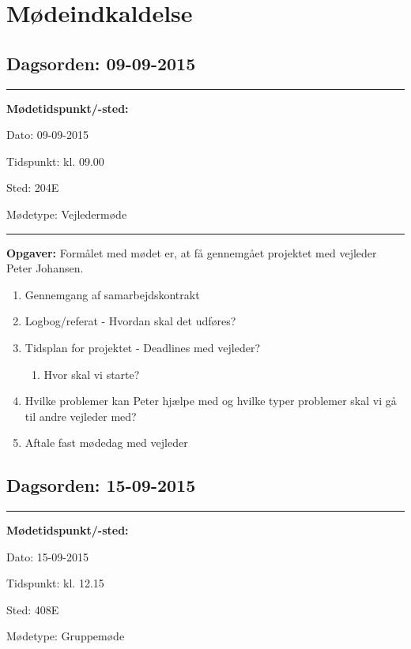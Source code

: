 \chapter{Mødeindkaldelse}


\section{Dagsorden: 09-09-2015}
\hrule



\textbf{Mødetidspunkt/-sted:} 

Dato: \tabto{7em} 09-09-2015

Tidspunkt: \tabto{7em} kl. 09.00

Sted: \tabto{7em} 204E

Mødetype: \tabto{7em} Vejledermøde \newline


\hrule
\textbf{Opgaver:} \newline
Formålet med mødet er, at få gennemgået projektet med vejleder Peter Johansen.
\begin{enumerate}
\item Gennemgang af samarbejdskontrakt

\item Logbog/referat - Hvordan skal det udføres?

\item Tidsplan for projektet - Deadlines med vejleder?
\begin{enumerate}
\item Hvor skal vi starte?
\end{enumerate}
\item Hvilke problemer kan Peter hjælpe med og hvilke typer problemer skal vi gå til andre vejleder med?
\item Aftale fast mødedag med vejleder
\end{enumerate}

\newpage
\section{Dagsorden: 15-09-2015}
\hrule



\textbf{Mødetidspunkt/-sted:} 

Dato: \tabto{7em} 15-09-2015

Tidspunkt: \tabto{7em} kl. 12.15

Sted: \tabto{7em} 408E

Mødetype: \tabto{7em} Gruppemøde \newline


